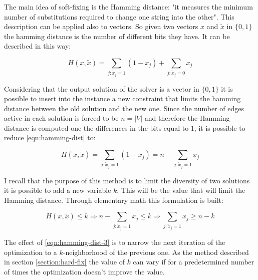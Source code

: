 The main idea of soft-fixing is the Hamming distance: "it measures the minimum number of substitutions required to change one string into the other"\cite{hamming-distance}. This description can be applied also to vectors. So given two vectors $x$ and $\tilde{x}$ in $\{0,1\}$ the hamming distance is the number of different bits they have. It can be described in this way:

\begin{equation}
\label{eqn:hamming-dist}
H(x, \tilde{x}) = \sum_{j:\tilde{x}_j=1}(1-x_j)+\sum_{j:\tilde{x}_j=0}x_j
\end{equation}

Considering that the output solution of the solver is a vector in $\{0, 1\}$ it is possible to insert into the instance a new constraint that limits the hamming distance between the old solution and the new one.
Since the number of edges active in each solution is forced to be $n=|V|$ and therefore the Hamming distance is computed one the differences in the bits equal to 1, it is possible to reduce \ref{eqn:hamming-dist} to:

\begin{equation}
\label{eqn:hamming-dist-2}
H(x, \tilde{x}) = \sum_{j:\tilde{x}_j=1}(1-x_j) =  n - \sum_{j:\tilde{x}_j=1}x_j
\end{equation}

I recall that the purpose of this method is to limit the diversity of two solutions it is possible to add a new variable $k$. This will be the value that will limit the Hamming distance. Through elementary math this formulation is built:

\begin{equation}
\label{eqn:hamming-dist-3}
H(x, \tilde{x}) \le k \Rightarrow n - \sum_{j:\tilde{x}_j=1}x_j \le k \Rightarrow \sum_{j:\tilde{x}_j=1}x_j \ge n - k
\end{equation}

The effect of \ref{eqn:hamming-dist-3} is to narrow the next iteration of the optimization to a $k$-neighborhood of the previous one. As the method described in section \ref{section:hard-fix} the value of $k$ can vary if for a predetermined number of times the optimization doesn't improve the value. 

